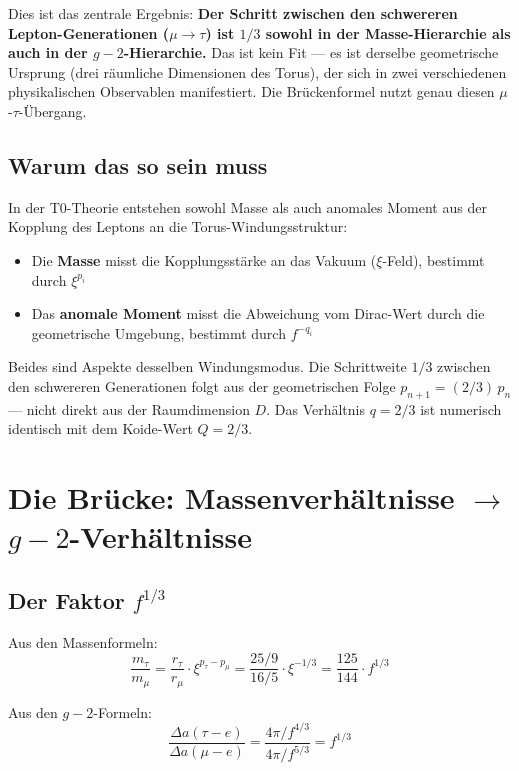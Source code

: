 Dies ist das zentrale Ergebnis: \textbf{Der Schritt zwischen den schwereren Lepton-Generationen ($\mu\to\tau$) ist $1/3$ sowohl in der Masse-Hierarchie als auch in der $g-2$-Hierarchie.} Das ist kein Fit — es ist derselbe geometrische Ursprung (drei räumliche Dimensionen des Torus), der sich in zwei verschiedenen physikalischen Observablen manifestiert. Die Brückenformel nutzt genau diesen $\mu$-$\tau$-Übergang.

\subsection{Warum das so sein muss}

In der T0-Theorie entstehen sowohl Masse als auch anomales Moment aus der Kopplung des Leptons an die Torus-Windungsstruktur:
\begin{itemize}
	\item Die \textbf{Masse} misst die Kopplungsstärke an das Vakuum ($\xi$-Feld), bestimmt durch $\xi^{p_i}$
	\item Das \textbf{anomale Moment} misst die Abweichung vom Dirac-Wert durch die geometrische Umgebung, bestimmt durch $f^{-q_i}$
\end{itemize}
Beides sind Aspekte desselben Windungsmodus. Die Schrittweite $1/3$
zwischen den schwereren Generationen folgt aus der geometrischen Folge
$p_{n+1} = (2/3)\,p_n$ — nicht direkt aus der Raumdimension $D$.
Das Verhältnis $q = 2/3$ ist numerisch identisch mit dem Koide-Wert
$Q = 2/3$.

\section{Die Brücke: Massenverhältnisse $\to$ $g-2$-Verhältnisse}

\subsection{Der Faktor $f^{1/3}$}

Aus den Massenformeln:
\begin{equation}
	\frac{m_\tau}{m_\mu} = \frac{r_\tau}{r_\mu} \cdot \xi^{p_\tau - p_\mu} 
	= \frac{25/9}{16/5} \cdot \xi^{-1/3} = \frac{125}{144} \cdot f^{1/3}
	\label{eq:massratio}
\end{equation}

Aus den $g-2$-Formeln:
\begin{equation}
	\frac{\Delta a(\tau{-}e)}{\Delta a(\mu{-}e)} 
	= \frac{4\pi/f^{4/3}}{4\pi/f^{5/3}} = f^{1/3}
	\label{eq:g2ratio}
\end{equation}

